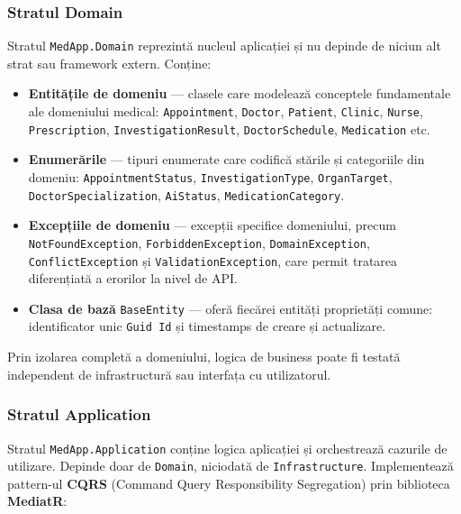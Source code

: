 \documentclass[12pt, a4paper]{report}
\begin{document}
\subsubsection{Stratul Domain}

Stratul \texttt{MedApp.Domain} reprezintă nucleul aplicației și nu depinde de niciun alt
strat sau framework extern. Conține:

\begin{itemize}
    \item \textbf{Entitățile de domeniu} --- clasele care modelează conceptele fundamentale
          ale domeniului medical: \texttt{Appointment}, \texttt{Doctor}, \texttt{Patient},
          \texttt{Clinic}, \texttt{Nurse}, \texttt{Prescription}, \texttt{InvestigationResult},
          \texttt{DoctorSchedule}, \texttt{Medication} etc.
    \item \textbf{Enumerările} --- tipuri enumerate care codifică stările și categoriile
          din domeniu: \texttt{AppointmentStatus}, \texttt{InvestigationType},
          \texttt{OrganTarget}, \texttt{DoctorSpecialization}, \texttt{AiStatus},
          \texttt{MedicationCategory}.
    \item \textbf{Excepțiile de domeniu} --- excepții specifice domeniului, precum
          \texttt{NotFoundException}, \texttt{ForbiddenException}, \texttt{DomainException},
          \texttt{ConflictException} și \texttt{ValidationException}, care permit tratarea
          diferențiată a erorilor la nivel de API.
    \item \textbf{Clasa de bază} \texttt{BaseEntity} --- oferă fiecărei entități proprietăți
          comune: identificator unic \texttt{Guid Id} și timestamps de creare și actualizare.
\end{itemize}

Prin izolarea completă a domeniului, logica de business poate fi testată independent de
infrastructură sau interfața cu utilizatorul.

\subsubsection{Stratul Application}

Stratul \texttt{MedApp.Application} conține logica aplicației și orchestrează cazurile de
utilizare. Depinde doar de \texttt{Domain}, niciodată de \texttt{Infrastructure}.
Implementează pattern-ul \textbf{CQRS} (Command Query Responsibility Segregation) prin
biblioteca \textbf{MediatR}:
\end{document}
